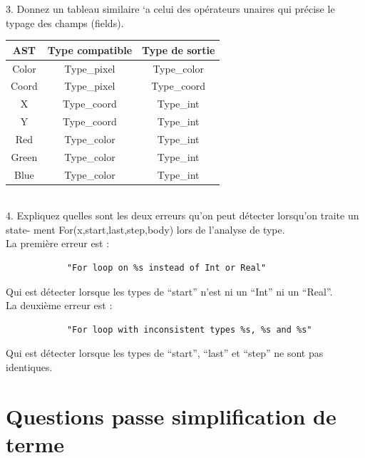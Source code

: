 \documentclass{report}
\begin{document}
    3. Donnez un tableau similaire `a celui des opérateurs unaires qui précise le typage des
        champs (fields).\\

        \begin{tabular}{| c | c | c |}
            \hline
            AST & Type compatible & Type de sortie \\
            \hline
            Color & Type\_pixel & Type\_color \\
            \hline
            Coord & Type\_pixel & Type\_coord \\
            \hline
            X & Type\_coord & Type\_int \\
            \hline
            Y & Type\_coord & Type\_int \\
            \hline
            Red & Type\_color & Type\_int \\
            \hline
            Green & Type\_color & Type\_int \\
            \hline
            Blue & Type\_color & Type\_int \\
            \hline
        \end{tabular}\\

    4. Expliquez quelles sont les deux erreurs qu'on peut détecter lorsqu'on traite un state-
        ment For(x,start,last,step,body) lors de l'analyse de type.\\

        La première erreur est :\\
        \begin{verbatim}
            "For loop on %s instead of Int or Real"
        \end{verbatim}
        \quad Qui est détecter lorsque les types de “start” n’est ni un “Int” ni un “Real”.\\
        \newline
        \newline
        \quad La deuxième erreur est :\\
        \begin{verbatim}
            "For loop with inconsistent types %s, %s and %s"
        \end{verbatim}
        \quad Qui est détecter lorsque les types de “start”, “last” et “step” ne sont pas identiques.\\

    \newpage

    \section{Questions passe simplification de terme}
\end{document}
